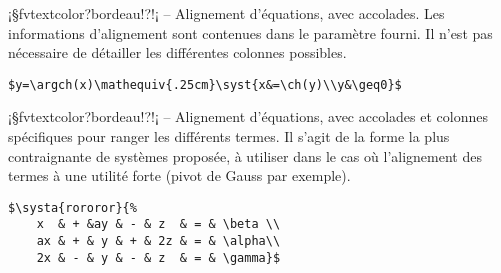 \documentclass[11pt,a4paper,rgb]{report}
\begin{document}
\inCodeStub¡§fvtextcolor?bordeau!?!¡ -- Alignement d'équations, avec accolades. Les informations d'alignement sont contenues dans le paramètre fourni. Il n'est pas nécessaire de détailler les différentes colonnes possibles.

\setlength{\leftskip}{.75cm}%
\setlength{\textwidth}{17.25cm}%

\colorbox{blue!15}{}
\hfill
\begin{minipage}{.65\textwidth}
	\begin{lstlisting}[linewidth=\textwidth, language={[LaTeX]TeX}]
	$y=\argch(x)\mathequiv{.25cm}\syst{x&=\ch(y)\\y&\geq0}$
	\end{lstlisting}
\end{minipage}

\setlength{\leftskip}{0pt}
\setlength{\textwidth}{18cm}%


\vspace*{.75cm}

\inCodeStub¡§fvtextcolor?bordeau!?!¡ -- Alignement d'équations, avec accolades et colonnes spécifiques pour ranger les différents termes. Il s'agit de la forme la plus contraignante de systèmes proposée, à utiliser dans le cas où l'alignement des termes à une utilité forte (pivot de Gauss par exemple).

\setlength{\leftskip}{.75cm}%
\setlength{\textwidth}{17.25cm}%

\colorbox{blue!15}{}
\hfill
\begin{minipage}{.65\textwidth}
	\begin{lstlisting}[linewidth=\textwidth, language={[LaTeX]TeX}]
	$\systa{rororor}{%
	x  & + &ay & - & z  & = & \beta \\
	ax & + & y & + & 2z & = & \alpha\\
	2x & - & y & - & z  & = & \gamma}$
	\end{lstlisting}
\end{minipage}

\setlength{\leftskip}{0pt}
\setlength{\textwidth}{18cm}%
\end{document}
